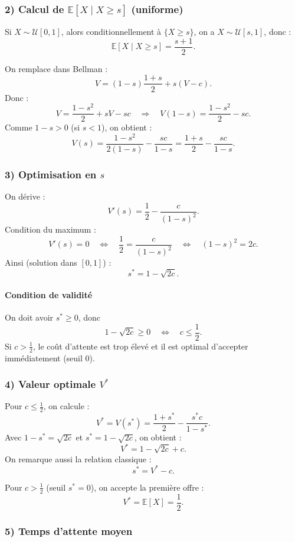 \subsubsection*{2) Calcul de $\mathbb{E}[X\mid X\ge s]$ (uniforme)}

Si $X\sim \mathcal{U}[0,1]$, alors conditionnellement à $\{X\ge s\}$, on a $X\sim \mathcal{U}[s,1]$,
donc :
\[
\mathbb{E}[X\mid X\ge s]=\frac{s+1}{2}.
\]

On remplace dans Bellman :
\[
V=(1-s)\frac{1+s}{2}+s(V-c).
\]
Donc :
\[
V=\frac{1-s^2}{2}+sV-sc
\quad\Longrightarrow\quad
V(1-s)=\frac{1-s^2}{2}-sc.
\]
Comme $1-s>0$ (si $s<1$), on obtient :
\[
V(s)=\frac{1-s^2}{2(1-s)}-\frac{sc}{1-s}
=\frac{1+s}{2}-\frac{sc}{1-s}.
\]

\subsubsection*{3) Optimisation en $s$}

On dérive :
\[
V'(s)=\frac12-\frac{c}{(1-s)^2}.
\]
Condition du maximum :
\[
V'(s)=0
\quad\Longleftrightarrow\quad
\frac12=\frac{c}{(1-s)^2}
\quad\Longleftrightarrow\quad
(1-s)^2=2c.
\]
Ainsi (solution dans $[0,1]$) :
\[
\boxed{s^*=1-\sqrt{2c}}.
\]

\paragraph{Condition de validité}
On doit avoir $s^*\ge 0$, donc
\[
1-\sqrt{2c}\ge 0
\quad\Longleftrightarrow\quad
c\le \frac12.
\]
Si $c>\frac12$, le coût d'attente est trop élevé et il est optimal d'accepter immédiatement (seuil $0$).

\subsubsection*{4) Valeur optimale $V^*$}

Pour $c\le \frac12$, on calcule :
\[
V^*=V(s^*)=\frac{1+s^*}{2}-\frac{s^*c}{1-s^*}.
\]
Avec $1-s^*=\sqrt{2c}$ et $s^*=1-\sqrt{2c}$, on obtient :
\[
\boxed{V^*=1-\sqrt{2c}+c}.
\]
On remarque aussi la relation classique :
\[
\boxed{s^*=V^*-c}.
\]

Pour $c>\frac12$ (seuil $s^*=0$), on accepte la première offre :
\[
V^*=\mathbb{E}[X]=\frac12.
\]

\subsubsection*{5) Temps d'attente moyen}

